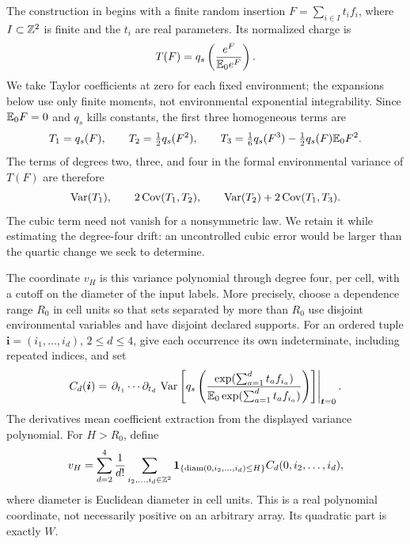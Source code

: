 The construction in \cite[Section~5, Definition ``Variance coordinate'']{R}
begins with a finite random
insertion \(F=\sum_{i\in I}t_i f_i\), where \(I\subset\mathbb Z^2\) is finite
and the \(t_i\) are real parameters.  Its normalized charge is
\[
 T(F)=q_s\left(\frac{e^F}{\mathbb E_0e^F}\right).
\]
We take Taylor coefficients at zero for each fixed environment; the
expansions below use only finite moments, not environmental exponential
integrability.
Since \(\mathbb E_0F=0\) and \(q_s\) kills constants, the first three
homogeneous terms are
\[
 T_1=q_s(F),\qquad T_2=\tfrac12q_s(F^2),\qquad
 T_3=\tfrac16q_s(F^3)-\tfrac12q_s(F)\mathbb E_0F^2.
\]
The terms of degrees two, three, and four in the formal environmental variance
of \(T(F)\) are therefore
\[
 \operatorname{Var}(T_1),\qquad 2\operatorname{Cov}(T_1,T_2),\qquad
 \operatorname{Var}(T_2)+2\operatorname{Cov}(T_1,T_3).
\]
The cubic term need not vanish for a nonsymmetric law.  We retain it
while estimating the degree-four drift: an uncontrolled cubic error
would be larger than the quartic change we seek to determine.

The coordinate \(v_H\) is this variance polynomial through degree four, per cell,
with a cutoff on the diameter of the input labels.  More precisely,
choose a dependence range \(R_0\) in cell units so that sets separated
by more than \(R_0\) use disjoint environmental variables and have
disjoint declared supports.  For an ordered tuple
\(\boldsymbol i=(i_1,\ldots,i_d)\), \(2\le d\le4\), give each
occurrence its own indeterminate, including repeated indices, and set
\begin{equation}
 C_d(\boldsymbol i)=
 \left.\partial_{t_1}\cdots\partial_{t_d}\,
 \operatorname{Var}\left[
 q_s\left(
 \frac{\exp(\sum_{a=1}^d t_a f_{i_a})}
      {\mathbb E_0\exp(\sum_{a=1}^d t_a f_{i_a})}
 \right)\right]\right|_{\boldsymbol t=0}.
 \label{eq:variance-coefficients}
\end{equation}
The derivatives mean coefficient extraction from the displayed variance
polynomial.  For \(H>R_0\), define
\begin{equation}
 v_H=\sum_{d=2}^4\frac1{d!}
 \sum_{i_2,\ldots,i_d\in\mathbb Z^2}
 \mathbf 1_{\{\operatorname{diam}(0,i_2,\ldots,i_d)\le H\}}
 C_d(0,i_2,\ldots,i_d),
 \label{eq:variance-coordinate}
\end{equation}
where diameter is Euclidean diameter in cell units.  This is a real
polynomial coordinate, not necessarily positive on an arbitrary array.
Its quadratic part is exactly \(W\).

